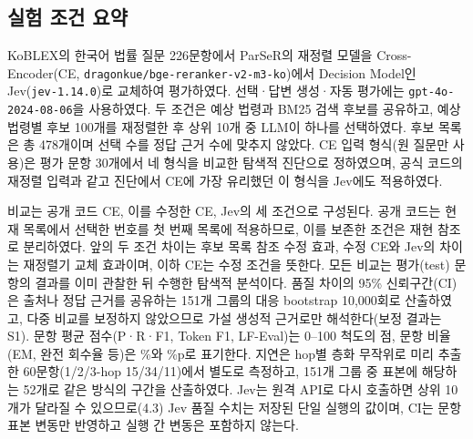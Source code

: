 \subsection{실험 조건 요약}

\label{sec:ch4_1}

KoBLEX의 한국어 법률 질문 226문항에서 ParSeR의 재정렬 모델을 Cross-Encoder(CE, \texttt{dragonkue/bge-reranker-v2-m3-ko})에서 Decision Model인 Jev(\texttt{jev-1.14.0})로 교체하여 평가하였다. 선택·답변 생성·자동 평가에는 \texttt{gpt-4o-2024-08-06}을 사용하였다. 두 조건은 예상 법령과 BM25 검색 후보를 공유하고, 예상 법령별 후보 100개를 재정렬한 후 상위 10개 중 LLM이 하나를 선택하였다. 후보 목록은 총 478개이며 선택 수를 정답 근거 수에 맞추지 않았다. CE 입력 형식(원 질문만 사용)은 평가 문항 30개에서 네 형식을 비교한 탐색적 진단으로 정하였으며, 공식 코드의 재정렬 입력과 같고 진단에서 CE에 가장 유리했던 이 형식을 Jev에도 적용하였다.

비교는 공개 코드 CE, 이를 수정한 CE, Jev의 세 조건으로 구성된다. 공개 코드는 현재 목록에서 선택한 번호를 첫 번째 목록에 적용하므로, 이를 보존한 조건은 재현 참조로 분리하였다. 앞의 두 조건 차이는 후보 목록 참조 수정 효과, 수정 CE와 Jev의 차이는 재정렬기 교체 효과이며, 이하 CE는 수정 조건을 뜻한다. 모든 비교는 평가(test) 문항의 결과를 이미 관찰한 뒤 수행한 탐색적 분석이다. 품질 차이의 95\% 신뢰구간(CI)은 출처나 정답 근거를 공유하는 151개 그룹의 대응 bootstrap 10,000회로 산출하였고, 다중 비교를 보정하지 않았으므로 가설 생성적 근거로만 해석한다(보정 결과는 S1). 문항 평균 점수(P·R·F1, Token F1, LF-Eval)는 0–100 척도의 점, 문항 비율(EM, 완전 회수율 등)은 \%와 \%p로 표기한다. 지연은 hop별 층화 무작위로 미리 추출한 60문항(1/2/3-hop 15/34/11)에서 별도로 측정하고, 151개 그룹 중 표본에 해당하는 52개로 같은 방식의 구간을 산출하였다. Jev는 원격 API로 다시 호출하면 상위 10개가 달라질 수 있으므로(4.3) Jev 품질 수치는 저장된 단일 실행의 값이며, CI는 문항 표본 변동만 반영하고 실행 간 변동은 포함하지 않는다.
